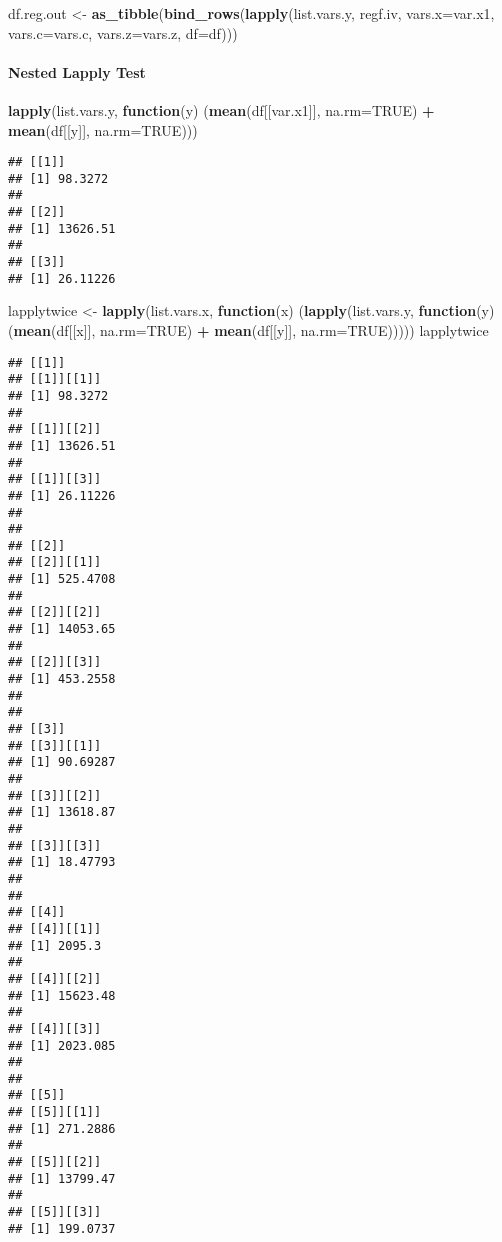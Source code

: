 \documentclass[
]{book}
\newenvironment{Shaded}{\begin{snugshade}}{\end{snugshade}}
\newcommand{\ControlFlowTok}[1]{\textcolor[rgb]{0.13,0.29,0.53}{\textbf{#1}}}
\newcommand{\DataTypeTok}[1]{\textcolor[rgb]{0.13,0.29,0.53}{#1}}
\newcommand{\KeywordTok}[1]{\textcolor[rgb]{0.13,0.29,0.53}{\textbf{#1}}}
\newcommand{\NormalTok}[1]{#1}
\newcommand{\OperatorTok}[1]{\textcolor[rgb]{0.81,0.36,0.00}{\textbf{#1}}}
\newcommand{\OtherTok}[1]{\textcolor[rgb]{0.56,0.35,0.01}{#1}}
\newcommand{\StringTok}[1]{\textcolor[rgb]{0.31,0.60,0.02}{#1}}
\begin{document}
\begin{Shaded}
\begin{Highlighting}[]
\NormalTok{df.reg.out <-}\StringTok{ }\KeywordTok{as_tibble}\NormalTok{(}\KeywordTok{bind_rows}\NormalTok{(}\KeywordTok{lapply}\NormalTok{(list.vars.y, regf.iv, }\DataTypeTok{vars.x=}\NormalTok{var.x1, }\DataTypeTok{vars.c=}\NormalTok{vars.c, }\DataTypeTok{vars.z=}\NormalTok{vars.z, }\DataTypeTok{df=}\NormalTok{df)))}
\end{Highlighting}
\end{Shaded}

\hypertarget{nested-lapply-test}{%
\paragraph{Nested Lapply Test}\label{nested-lapply-test}}

\begin{Shaded}
\begin{Highlighting}[]
\KeywordTok{lapply}\NormalTok{(list.vars.y, }\ControlFlowTok{function}\NormalTok{(y) (}\KeywordTok{mean}\NormalTok{(df[[var.x1]], }\DataTypeTok{na.rm=}\OtherTok{TRUE}\NormalTok{) }\OperatorTok{+}\StringTok{ }\KeywordTok{mean}\NormalTok{(df[[y]], }\DataTypeTok{na.rm=}\OtherTok{TRUE}\NormalTok{)))}
\end{Highlighting}
\end{Shaded}

\begin{verbatim}
## [[1]]
## [1] 98.3272
## 
## [[2]]
## [1] 13626.51
## 
## [[3]]
## [1] 26.11226
\end{verbatim}

\begin{Shaded}
\begin{Highlighting}[]
\NormalTok{lapplytwice <-}\StringTok{ }\KeywordTok{lapply}\NormalTok{(list.vars.x, }\ControlFlowTok{function}\NormalTok{(x) (}\KeywordTok{lapply}\NormalTok{(list.vars.y, }\ControlFlowTok{function}\NormalTok{(y) (}\KeywordTok{mean}\NormalTok{(df[[x]], }\DataTypeTok{na.rm=}\OtherTok{TRUE}\NormalTok{) }\OperatorTok{+}\StringTok{ }\KeywordTok{mean}\NormalTok{(df[[y]], }\DataTypeTok{na.rm=}\OtherTok{TRUE}\NormalTok{)))))}
\NormalTok{lapplytwice}
\end{Highlighting}
\end{Shaded}

\begin{verbatim}
## [[1]]
## [[1]][[1]]
## [1] 98.3272
## 
## [[1]][[2]]
## [1] 13626.51
## 
## [[1]][[3]]
## [1] 26.11226
## 
## 
## [[2]]
## [[2]][[1]]
## [1] 525.4708
## 
## [[2]][[2]]
## [1] 14053.65
## 
## [[2]][[3]]
## [1] 453.2558
## 
## 
## [[3]]
## [[3]][[1]]
## [1] 90.69287
## 
## [[3]][[2]]
## [1] 13618.87
## 
## [[3]][[3]]
## [1] 18.47793
## 
## 
## [[4]]
## [[4]][[1]]
## [1] 2095.3
## 
## [[4]][[2]]
## [1] 15623.48
## 
## [[4]][[3]]
## [1] 2023.085
## 
## 
## [[5]]
## [[5]][[1]]
## [1] 271.2886
## 
## [[5]][[2]]
## [1] 13799.47
## 
## [[5]][[3]]
## [1] 199.0737
\end{verbatim}
\end{document}
